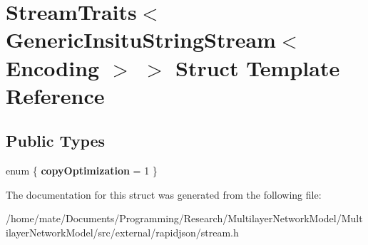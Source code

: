 \hypertarget{structStreamTraits_3_01GenericInsituStringStream_3_01Encoding_01_4_01_4}{}\section{Stream\+Traits$<$ Generic\+Insitu\+String\+Stream$<$ Encoding $>$ $>$ Struct Template Reference}
\label{structStreamTraits_3_01GenericInsituStringStream_3_01Encoding_01_4_01_4}
\subsection*{Public Types}
\begin{DoxyCompactItemize}
\item 
enum \{ {\bfseries copy\+Optimization} = 1
 \}\hypertarget{structStreamTraits_3_01GenericInsituStringStream_3_01Encoding_01_4_01_4_a67a610522828f475093e1e3c3b51a793}{}\label{structStreamTraits_3_01GenericInsituStringStream_3_01Encoding_01_4_01_4_a67a610522828f475093e1e3c3b51a793}

\end{DoxyCompactItemize}


The documentation for this struct was generated from the following file\+:\begin{DoxyCompactItemize}
\item 
/home/mate/\+Documents/\+Programming/\+Research/\+Multilayer\+Network\+Model/\+Multilayer\+Network\+Model/src/external/rapidjson/stream.\+h\end{DoxyCompactItemize}
